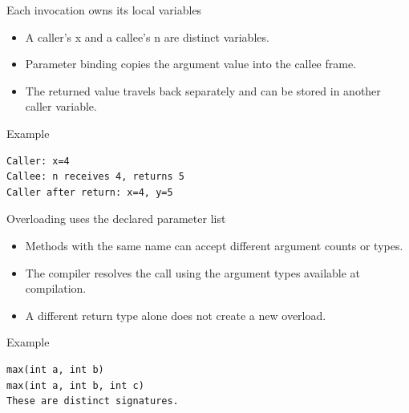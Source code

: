 \documentclass[10pt,aspectratio=169]{beamer}
\begin{document}
\begin{frame}[fragile,t]{Each invocation owns its local variables}
\begin{itemize}
\item A caller's x and a callee's n are distinct variables.
\item Parameter binding copies the argument value into the callee frame.
\item The returned value travels back separately and can be stored in another caller variable.
\end{itemize}
\vspace{1mm}\begin{block}{Example}
\begin{lstlisting}
Caller: x=4
Callee: n receives 4, returns 5
Caller after return: x=4, y=5
\end{lstlisting}
\end{block}
\end{frame}

\begin{frame}[fragile,t]{Overloading uses the declared parameter list}
\begin{itemize}
\item Methods with the same name can accept different argument counts or types.
\item The compiler resolves the call using the argument types available at compilation.
\item A different return type alone does not create a new overload.
\end{itemize}
\vspace{1mm}\begin{block}{Example}
\begin{lstlisting}
max(int a, int b)
max(int a, int b, int c)
These are distinct signatures.
\end{lstlisting}
\end{block}
\end{frame}
\end{document}
